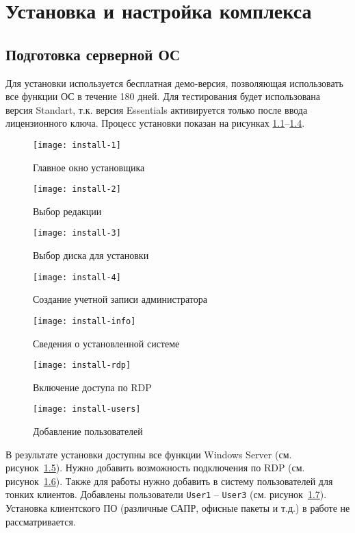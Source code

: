 \chapter{Установка и настройка комплекса}

\section{Подготовка серверной ОС}

Для установки используется бесплатная демо-версия, позволяющая использовать все функции
ОС в течение 180 дней. Для тестирования будет использована версия Standart, т.к.
версия Essentials активируется только после ввода лицензионного ключа. Процесс установки
показан на рисунках \ref{pic:install-1}–\ref{pic:install-4}.

\begin{figure}[h]
    \center
    \texttt{[image: install-1]}
    \caption{Главное окно установщика}
    \label{pic:install-1}
\end{figure}

\begin{figure}[p]
    \center
    \texttt{[image: install-2]}
    \caption{Выбор редакции}
    \label{pic:install-2}
\end{figure}

\begin{figure}[p]
    \center
    \texttt{[image: install-3]}
    \caption{Выбор диска для установки}
    \label{pic:install-3}
\end{figure}

\begin{figure}[p]
    \center
    \texttt{[image: install-4]}
    \caption{Создание учетной записи администратора}
    \label{pic:install-4}
\end{figure}

\begin{figure}[p]
    \center
    \texttt{[image: install-info]}
    \caption{Сведения о установленной системе}
    \label{pic:install-info}
\end{figure}

\begin{figure}[p]
    \center
    \texttt{[image: install-rdp]}
    \caption{Включение доступа по RDP}
    \label{pic:install-rdp}
\end{figure}

\begin{figure}[h]
    \center
    \texttt{[image: install-users]}
    \caption{Добавление пользователей}
    \label{pic:install-users}
\end{figure}

В результате установки доступны все функции Windows Server (см.
рисунок~\ref{pic:install-info}). Нужно добавить возможность подключения по RDP
(см. рисунок~\ref{pic:install-rdp}). Также для работы нужно добавить в систему пользователей
для тонких клиентов. Добавлены пользователи \texttt{User1} – \texttt{User3} (см.
рисунок~\ref{pic:install-users}). Установка клиентского ПО (различные САПР, офисные
пакеты и т.д.) в работе не рассматривается.
